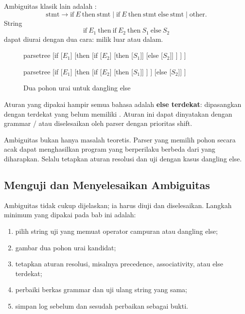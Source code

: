 Ambiguitas klasik lain adalah :
\[
\text{stmt} \to \text{if}\ E\ \text{then}\ \text{stmt}
\mid \text{if}\ E\ \text{then}\ \text{stmt}\ \text{else}\
\text{stmt} \mid \text{other}.
\]
String
\[
\text{if}\ E_1\ \text{then}\ \text{if}\ E_2\ \text{then}\ S_1\
\text{else}\ S_2
\]
dapat diurai dengan dua cara:  milik  luar atau
 dalam.

\begin{figure}[H]
\centering
\begin{minipage}{0.46\textwidth}
\centering
\begin{forest}
parsetree
[if
  [\(E_1\)]
  [then
    [if
      [\(E_2\)]
      [then [\(S_1\)]]
      [else [\(S_2\)]]
    ]
  ]
]
\end{forest}
\end{minipage}\hfill
\begin{minipage}{0.46\textwidth}
\centering
\begin{forest}
parsetree
[if
  [\(E_1\)]
  [then
    [if
      [\(E_2\)]
      [then [\(S_1\)]]
    ]
  ]
  [else [\(S_2\)]]
]
\end{forest}
\end{minipage}
\caption{Dua pohon urai untuk dangling else}
\label{fig:ch09-dangling}
\end{figure}

Aturan yang dipakai hampir semua bahasa adalah \textbf{else terdekat}:
 dipasangkan dengan  terdekat yang belum memiliki
\code{else}. Aturan ini dapat dinyatakan dengan grammar
\code{matched}/\code{unmatched} atau diselesaikan oleh parser dengan
prioritas shift.

\begin{warningbox}
Ambiguitas bukan hanya masalah teoretis. Parser yang memilih pohon
secara acak dapat menghasilkan program yang berperilaku berbeda dari
yang diharapkan. Selalu tetapkan aturan resolusi dan uji dengan kasus
dangling else.
\end{warningbox}

\subsection{Menguji dan Menyelesaikan Ambiguitas}

Ambiguitas tidak cukup dijelaskan; ia harus diuji dan diselesaikan.
Langkah minimum yang dipakai pada bab ini adalah:
\begin{enumerate}[label=\arabic*.,leftmargin=*]
  \item pilih string uji yang memuat operator campuran atau dangling
        else;
  \item gambar dua pohon urai kandidat;
  \item tetapkan aturan resolusi, misalnya precedence, associativity,
        atau else terdekat;
  \item perbaiki berkas grammar dan uji ulang string yang sama;
  \item simpan log sebelum dan sesudah perbaikan sebagai bukti.
\end{enumerate}
